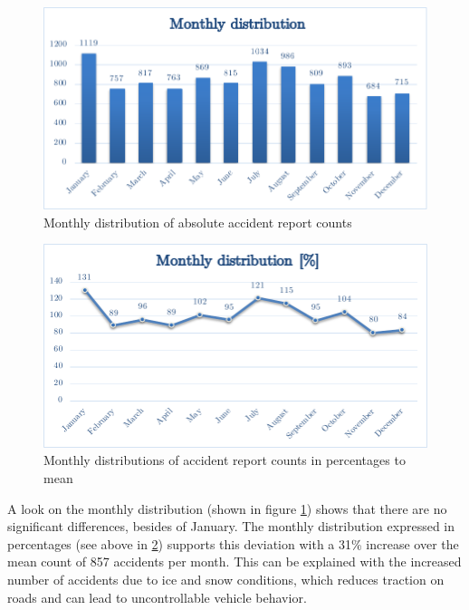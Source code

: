 \documentclass[a4paper,12pt]{report}
\begin{document}
\begin{figure}[h]
	\centering
	\includegraphics[scale=0.6]{./assets/baysis_dataset_monthly_absolute.pdf}
	\caption{Monthly distribution of absolute accident report counts}
	\label{img:baysis_monthlyDist_absolute}
\end{figure}

\begin{figure}[h]
	\centering
	\includegraphics[scale=0.6]{./assets/baysis_dataset_monthly_percentage.pdf}
	\caption{Monthly distributions of accident report counts in percentages to mean}
	\label{img:baysis_monthlyDist_percentage}
\end{figure}

A look on the monthly distribution (shown in figure \ref{img:baysis_monthlyDist_absolute}) shows that there are no significant differences, besides of January. The monthly distribution expressed in percentages (see above in \ref{img:baysis_monthlyDist_percentage}) supports this deviation with a 31\% increase over the mean count of 857 accidents per month. This can be explained with the increased number of accidents due to ice and snow conditions, which reduces traction on roads and can lead to uncontrollable vehicle behavior. 
\end{document}

